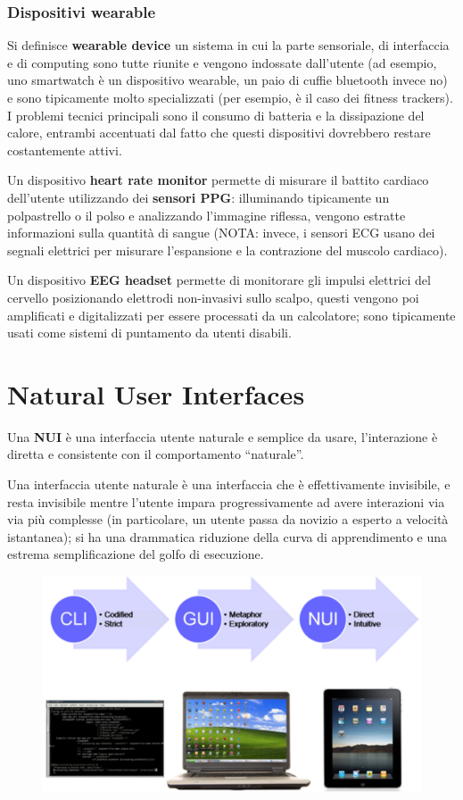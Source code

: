 \subsubsection*{Dispositivi wearable}
Si definisce \textbf{wearable device} un sistema in cui la parte sensoriale, di interfaccia e di computing sono tutte riunite e vengono indossate
dall'utente (ad esempio, uno smartwatch è un dispositivo wearable, un paio di cuffie bluetooth invece no) e sono tipicamente molto specializzati
(per esempio, è il caso dei fitness trackers). I problemi tecnici principali sono il consumo di batteria e la dissipazione del calore, entrambi accentuati
dal fatto che questi dispositivi dovrebbero restare costantemente attivi.

Un dispositivo \textbf{heart rate monitor} permette di misurare il battito cardiaco dell'utente utilizzando dei \textbf{sensori PPG}: illuminando
tipicamente un polpastrello o il polso e analizzando l'immagine riflessa, vengono estratte informazioni sulla quantità di sangue
(NOTA: invece, i sensori ECG usano dei segnali elettrici per misurare l'espansione e la contrazione del muscolo cardiaco).

Un dispositivo \textbf{EEG headset} permette di monitorare gli impulsi elettrici del cervello posizionando elettrodi non-invasivi sullo scalpo, questi
vengono poi amplificati e digitalizzati per essere processati da un calcolatore; sono tipicamente usati come sistemi di puntamento da utenti disabili.

\section{Natural User Interfaces}
Una \textbf{NUI} è una interfaccia utente naturale e semplice da usare, l'interazione è diretta e consistente con il comportamento ``naturale''.

Una interfaccia utente naturale è una interfaccia che è effettivamente invisibile, e resta invisibile mentre l'utente impara progressivamente ad avere
interazioni via via più complesse (in particolare, un utente passa da novizio a esperto a velocità istantanea); si ha una drammatica riduzione della
curva di apprendimento e una estrema semplificazione del golfo di esecuzione.
\pagebreak
\begin{figure}[!h]
	\centering
	\includegraphics[scale=0.3]{immagini/nui-concetto.png}
\end{figure}

